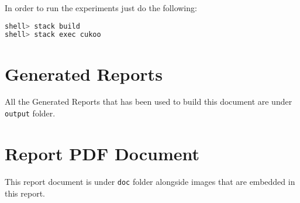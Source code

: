 \documentclass[12pt, a4paper]{article}
\begin{document}
In order to run the experiments just do the following:

\begin{lstlisting}[language=Haskell,title={Running Experiments}]
shell> stack build
shell> stack exec cukoo
\end{lstlisting}

\section{Generated Reports}
All the Generated Reports that has been used to build this document are under \texttt{output} folder.


\section{Report PDF Document}
This report document is under \texttt{doc} folder alongside images that are embedded in this report.





\printglossary[type=\acronymtype]
\end{document}
